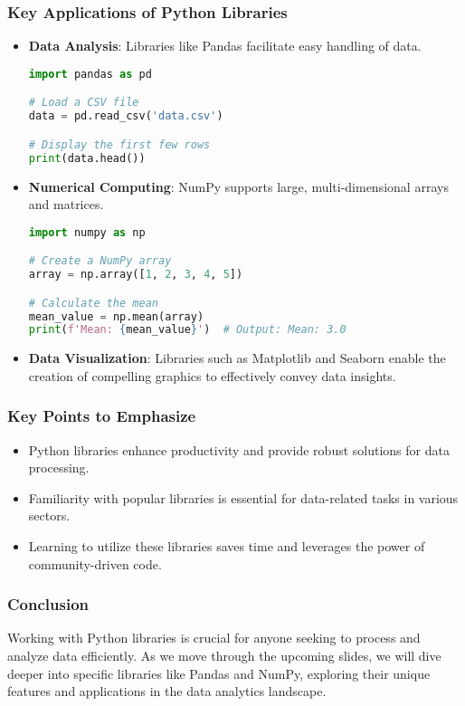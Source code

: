\documentclass[aspectratio=169]{beamer}
\begin{document}
\begin{frame}[fragile]
    \frametitle{Key Applications of Python Libraries}
    \begin{itemize}
        \item \textbf{Data Analysis}: Libraries like Pandas facilitate easy handling of data.
        \begin{lstlisting}[language=Python]
import pandas as pd

# Load a CSV file
data = pd.read_csv('data.csv')

# Display the first few rows
print(data.head())
        \end{lstlisting}

        \item \textbf{Numerical Computing}: NumPy supports large, multi-dimensional arrays and matrices.
        \begin{lstlisting}[language=Python]
import numpy as np

# Create a NumPy array
array = np.array([1, 2, 3, 4, 5])

# Calculate the mean
mean_value = np.mean(array)
print(f'Mean: {mean_value}')  # Output: Mean: 3.0
        \end{lstlisting}

        \item \textbf{Data Visualization}: Libraries such as Matplotlib and Seaborn enable the creation of compelling graphics to effectively convey data insights.
    \end{itemize}
\end{frame}

\begin{frame}[fragile]
    \frametitle{Key Points to Emphasize}
    \begin{itemize}
        \item Python libraries enhance productivity and provide robust solutions for data processing.
        \item Familiarity with popular libraries is essential for data-related tasks in various sectors.
        \item Learning to utilize these libraries saves time and leverages the power of community-driven code.
    \end{itemize}
\end{frame}

\begin{frame}[fragile]
    \frametitle{Conclusion}
    Working with Python libraries is crucial for anyone seeking to process and analyze data efficiently. As we move through the upcoming slides, we will dive deeper into specific libraries like Pandas and NumPy, exploring their unique features and applications in the data analytics landscape.
\end{frame}
\end{document}

